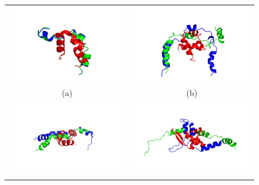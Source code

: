 \begin{figure}
\centering
\begin{tabular}{c c}
\\
\includegraphics[width=8.5cm]{images/2F4K.png} & \includegraphics[width=8.5cm]{images/2JUC.png} \\
(a) & (b)\\
\includegraphics[width=8.5cm]{images/2MR9.png} & \includegraphics[width=8.5cm]{images/2P5K.png} \\

\end{tabular}
\end{figure}
